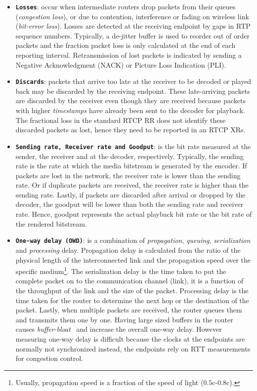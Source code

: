 \begin{itemize}
\setlength{\itemsep}{0pt}

\item \textbf{\texttt{Losses}}: occur when intermediate routers drop packets
from their queues (\emph{congestion loss}), or due to contention, interference
or fading on wireless link (\emph {bit-error loss}). Losses are detected at
the receiving endpoint by gaps in RTP sequence numbers. Typically, a de-jitter
buffer is used to reorder out of order packets and the fraction packet loss is
only calculated at the end of each reporting interval. Retransmission of lost
packets is indicated by sending a Negative Acknowledgment (NACK) or Picture
Loss Indication (PLI).

\item \textbf{\texttt{Discards}}: packets that arrive too late at the receiver
to be decoded or played back may be discarded by the receiving endpoint. These
late-arriving packets are discarded by the receiver even though they are
received because packets with higher \textit{timestamps} have already been
sent to the decoder for playback. The fractional loss in the standard RTCP RR
does not identify these discarded packets as lost, hence they need to be
reported in an RTCP XRs.

\item \textbf{\texttt{Sending rate, Receiver rate and Goodput}}: is the bit
rate measured at the sender, the receiver and at the decoder, respectively.
Typically, the sending rate is the rate at which the media bitstream is
generated by the encoder. If packets are lost in the network, the receiver
rate is lower than the sending rate. Or if duplicate packets are received, the
receiver rate is higher than the sending rate. Lastly, if packets are
discarded after arrival or dropped by the decoder, the goodput will be lower
than both the sending rate and receiver rate. Hence, goodput represents the
actual playback bit rate or the bit rate of the rendered bitstream.

\item \textbf{\texttt{One-way delay (OWD)}}: is a combination of
\emph{propagation}, \emph{queuing}, \emph{serialization} and \emph{processing}
delay. Propagation delay is calculated from the ratio of the physical length of
the interconnected link and the propagation speed over the specific
medium\footnote{Usually, propagation speed is a fraction of the speed of light
($0.5$c-$0.8$c).}. The serialization delay is the time taken to put the
complete packet on to the communication channel (link), it is a function of
the throughput of the link and the size of the packet. Processing delay is the
time taken for the router to determine the next hop or the destination of the
packet. Lastly, when multiple packets are received, the router queues them and
transmits them one by one. Having large sized buffers in the router causes
\emph{buffer-bloat}~\cite{gettys:bufferbloat} and increase the overall one-way
delay. However measuring one-way delay is difficult because the clocks at the
endpoints are normally not synchronized instead, the endpoints rely on RTT
measurements for congestion control.


\end{itemize}

